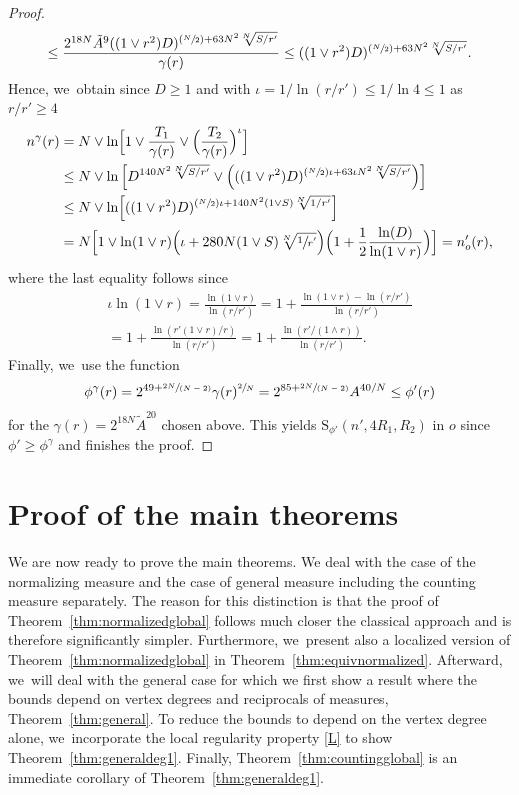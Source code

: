 \documentclass[10pt]{amsart}
\newcommand{\Psfrac}[2]{(\sfrac{#1}{#2})}
\newcommand{\spfrac}[2]{\sfrac{#1}{(#2)}}
\newcommand{\rS}{\mathrm{S}}
\theoremstyle{plain}
\theoremstyle{definition}
\begin{document}
\begin{proof}
\[\leq
\frac{2^{18 N}\tilde A^9((1\vee r^2) D)^{\Psfrac{N}{2}+{63 N^2\sqrt[ N]{S/r'}}}}{\gamma(r)}
\leq ((1\vee r^2) D)^{\Psfrac{N}{2}+{63 N^2\sqrt[ N]{S/r'}}}.
\]
Hence, we~obtain since $ D\geq 1$ and with $ \iota=1/\ln(r/r') \le 1/\ln {4}\le {1}$ as $ r/r' \ge {4}$
\begin{align*}
n^\gamma(r)&=
N\vee \ln\Bigl[1\vee
\frac{T_1}{\gamma(r)}\vee \Bigl(\frac{T_2}{\gamma(r)}\Bigr)^{\iota}
\Bigr]
\\
&\leq
N\vee \ln \left[ D^{140 N^2\sqrt[ N]{S/r'}}\vee \left(((1\vee r^2) D)^{\Psfrac{N}{2}\iota+{63\iota N^2\sqrt[ N]{S/r'}}}\right)\right]
\\
&\leq
N\vee \ln \Bigl[ ((1\vee r^2) D)^{\Psfrac{N}{2}\iota+{140 N^2(1\vee S)\sqrt[ N]{1/r'}}}\Bigr]
\\
&=
N\Bigl[1\vee \ln (1\vee r)\Bigl({{\iota}+{280 N(1\vee S)\sqrt[ N]{\sfrac {1}{r'}}}}\Bigr) \Bigl( 1+ \frac{1}{2}\frac{\ln ( D)}{\ln (1\vee r)}\Bigr)
\Bigr]=n_o'(r),
\end{align*}
where the last equality follows since
\begin{multline*} \iota \ln (1\vee r)= \frac{\ln (1\vee r)}{\ln (r/r')} =1 + \frac{\ln (1\vee r) -\ln (r/r') }{\ln (r/r')}
\\
=1 + \frac{\ln(r'(1\vee r)/r)}{\ln(r/r')} =1 + \frac{\ln(r'/(1\wedge r))}{\ln(r/r')}.
\end{multline*}
Finally, we~{use} the function
\[
\phi^{\gamma}(r) =2^{49+\spfrac{2 N}{N-2}}\gamma(r)^{\sfrac{2}{N}}=2^{85+\spfrac{2 N}{N-2}} A^{40/ N}\leq \phi'(r)
\]
for the $ \gamma(r)= 2^{18 N}\tilde A^{{20}}$ chosen above.
This yields $\rS_{\phi'}( n', 4R_1,R_2)$ in $o$ since $ \phi'\ge \phi^{\gamma} $ and finishes the proof.
\end{proof}

\section{Proof of the main theorems}\label{section:remaining}

We are now ready to prove the main theorems. {We deal with the case of the normalizing measure and the case of general measure including the counting measure separately.
The reason for this distinction is that the proof of Theorem~\ref{thm:normalizedglobal} follows much closer the classical approach and is therefore significantly simpler. Furthermore, we~present also a localized version of Theorem~\ref{thm:normalizedglobal} in Theorem~\ref{thm:equivnormalized}.
}
Afterward, we~will deal with the general case for which we first show a result where the bounds depend on vertex degrees and reciprocals of measures, Theorem~\ref{thm:general}. To reduce the bounds to depend on the vertex degree alone, we~incorporate the local regularity property \eqref{L} to show Theorem~\ref{thm:generaldeg1}. Finally, Theorem~\ref{thm:countingglobal} is an immediate corollary of Theorem~\ref{thm:generaldeg1}.
\end{document}
